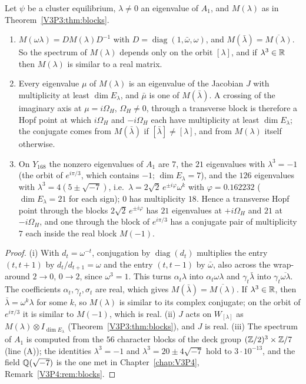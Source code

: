 \begin{proposition}\label{V3P3:prop:hopfstruct}
Let $\psi$ be a cluster equilibrium, $\lambda\ne0$ an eigenvalue of $A_1$, and $M(\lambda)$ as in
Theorem~\ref{V3P3:thm:blocks}.
\begin{enumerate}
\item[(i)] $M(\omega\lambda)=DM(\lambda)D^{-1}$ with $D=\operatorname{diag}(1,\bar\omega,\omega)$, and
$M(\bar\lambda)=\overline{M(\lambda)}$. So the spectrum of $M(\lambda)$ depends only on the orbit
$[\lambda]$, and if $\lambda^{3}\in\mathbb{R}$ then $M(\lambda)$ is similar to a real matrix.
\item[(ii)] Every eigenvalue $\mu$ of $M(\lambda)$ is an eigenvalue of the Jacobian $J$ with
multiplicity at least $\dim E_\lambda$, and $\bar\mu$ is one of $M(\bar\lambda)$. A crossing of the
imaginary axis at $\mu=i\Omega_H$, $\Omega_H\ne0$, through a transverse block is therefore a Hopf point
at which $i\Omega_H$ and $-i\Omega_H$ each have multiplicity at least $\dim E_\lambda$; the conjugate
comes from $M(\bar\lambda)$ if $[\bar\lambda]\ne[\lambda]$, and from $M(\lambda)$ itself otherwise.
\item[(iii)] On $Y_{168}$ the nonzero eigenvalues of $A_1$ are $7$, the $21$ eigenvalues with
$\lambda^{3}=-1$ (the orbit of $e^{i\pi/3}$, which contains $-1$; $\dim E_\lambda=7$), and the $126$
eigenvalues with $\lambda^{3}=4(5\pm\sqrt{-7})$, i.e.\ $\lambda=2\sqrt2\,e^{\pm i\varphi}\omega^{k}$
with $\varphi=0.162232$ ($\dim E_\lambda=21$ for each sign); $0$ has multiplicity $18$. Hence a
transverse Hopf point through the blocks $2\sqrt2\,e^{\pm i\varphi}$ has $21$ eigenvalues at
$+i\Omega_H$ and $21$ at $-i\Omega_H$, and one through the block of $e^{i\pi/3}$ has a conjugate
pair of multiplicity $7$ each inside the real block $M(-1)$.
\end{enumerate}
\end{proposition}

\begin{proof}
(i) With $d_t=\omega^{-t}$, conjugation by $\operatorname{diag}(d_t)$ multiplies the entry $(t,t+1)$ by
$d_t/d_{t+1}=\omega$ and the entry $(t,t-1)$ by $\bar\omega$, also across the wrap-around $2\to0$,
$0\to2$, since $\omega^{3}=1$. This turns $\alpha_t\lambda$ into $\alpha_t\omega\lambda$ and
$\gamma_t\bar\lambda$ into $\gamma_t\overline{\omega\lambda}$. The coefficients
$\alpha_t,\gamma_t,\sigma_t$ are real, which gives $M(\bar\lambda)=\overline{M(\lambda)}$. If
$\lambda^{3}\in\mathbb{R}$, then $\bar\lambda=\omega^{k}\lambda$ for some $k$, so $M(\lambda)$ is similar to its
complex conjugate; on the orbit of $e^{i\pi/3}$ it is similar to $M(-1)$, which is real. (ii) $J$
acts on $W_{[\lambda]}$ as $M(\lambda)\otimes I_{\dim E_\lambda}$ (Theorem~\ref{V3P3:thm:blocks}), and
$J$ is real. (iii) The spectrum of $A_1$ is computed from the $56$ character blocks of the deck group
$(\mathbb{Z}/2)^{3}\times\mathbb{Z}/7$ (line (A)); the identities $\lambda^{3}=-1$ and $\lambda^{3}=20\pm4\sqrt{-7}$ hold to
$3\cdot10^{-13}$, and the field $\mathbb{Q}(\sqrt{-7})$ is the one met in Chapter~\ref{chap:V3P4},
Remark~\ref{V3P4:rem:blocks}.
\end{proof}

